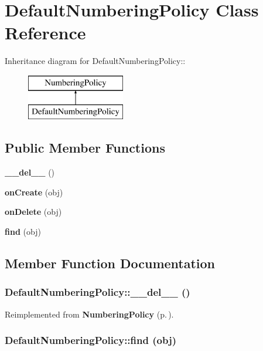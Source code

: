\section{Default\-Numbering\-Policy Class Reference}
\label{classDefaultNumberingPolicy}
Inheritance diagram for Default\-Numbering\-Policy::\begin{figure}[H]
\begin{center}
\leavevmode
\includegraphics[height=2cm]{classDefaultNumberingPolicy}
\end{center}
\end{figure}
\subsection*{Public Member Functions}
\begin{CompactItemize}
\item 
{\bf \_\-\_\-del\_\-\_\-} ()
\item 
{\bf on\-Create} (obj)
\item 
{\bf on\-Delete} (obj)
\item 
{\bf find} (obj)
\end{CompactItemize}


\subsection{Member Function Documentation}
\subsubsection{\setlength{\rightskip}{0pt plus 5cm}Default\-Numbering\-Policy::\_\-\_\-del\_\-\_\- ()}\label{classDefaultNumberingPolicy_DefaultNumberingPolicya0}




Reimplemented from {\bf Numbering\-Policy} {\rm (p.\,\pageref{classNumberingPolicy_NumberingPolicya0})}.
\subsubsection{\setlength{\rightskip}{0pt plus 5cm}Default\-Numbering\-Policy::find (obj)}\label{classDefaultNumberingPolicy_DefaultNumberingPolicya3}


